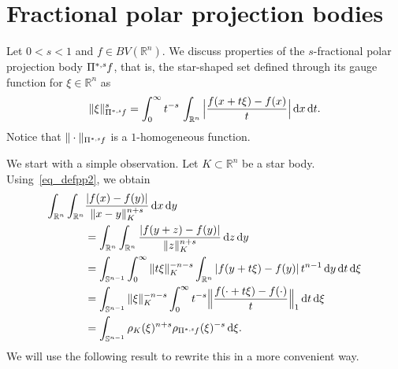 \documentclass{amsart}
\newcommand{\ofpp}[1]{\operatorname{\Pi^{\ast,{\it #1}}}\!}
\newcommand{\snvtex}{{\mathbb S}^{n-1}}
\newcommand{\dvtex}{\,\mathrm{d}}
\begin{document}
\section{Fractional polar projection bodies}
\label{sec_fpp}

Let $0<s<1$ and $f\in BV(\mathbb R^{n})$. We discuss properties of the
$s$-fractional polar projection body $\ofpp{s} f$, that is, the star-shaped
set defined through its gauge function for $\xi \in \mathbb R^{n}$ as
%
\begin{equation}
\label{eq_defpp2}
\Vert{\xi}\Vert _{\ofpp{s}f}^{s}= \int _{0}^{\infty }t^{-s}\, \int _{
\mathbb R^{n}}\Big\vert \frac{f(x +t\xi )-f(x)}{t}\Big\vert \dvtex x\dvtex t.
\end{equation}
%
Notice that $\|\cdot \|_{\ofpp sf}$ is a $1$-homogeneous function.


We start with a simple observation. Let $K\subset \mathbb R^{n}$ be a star
body. Using~\eqref{eq_defpp2}, we obtain
%
\begin{align}
\int _{\mathbb R^{n}}\int _{\mathbb R^{n}} &
\frac{|f(x)-f(y)|}{\|x-y\|_{K}^{n+s}} \dvtex x \dvtex y
\nonumber \\
&= \int _{\mathbb R^{n}}\int _{\mathbb R^{n}}
\frac{|f(y+z)-f(y)|}{\|z\|_{K}^{n+s}} \dvtex z \dvtex y
\nonumber \\
&= \int _{\snvtex} \int _{0}^{\infty }{\|t \xi \|_{K}^{-n-s}} \int _{
\mathbb R^{n}} {|f(y+t\xi )-f(y)|}\,t^{n-1} \dvtex y \dvtex t \dvtex \xi
\label{eq_frac_func}
\\
&= \int _{\snvtex}{\| \xi \|_{K}^{-n-s}} \int _{0}^{\infty }t^{-s} \Big\|
\frac{f(\cdot +t\xi ) - f(\cdot )}{t}\Big\|_{1} \dvtex t \dvtex \xi
\nonumber \\
&= \int _{\snvtex} \rho _{K}(\xi )^{n+s} \rho _{\ofpp{s} f}(\xi )^{-s}
\dvtex \xi .
\nonumber \end{align}
%
We will use the following result to rewrite this in a more convenient way.
\end{document}
